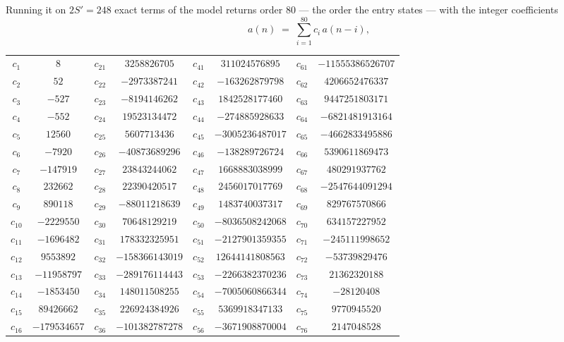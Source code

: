 \documentclass[11pt,a4paper]{article}
\theoremstyle{plain}
\theoremstyle{definition}
\begin{document}
Running it on $2S'=248$ exact terms of the model returns order $80$ --- the order the
entry states --- with the integer coefficients
\[
a(n)\;=\;\sum_{i=1}^{80}c_i\,a(n-i),
\]
\begin{center}\small
\begin{tabular}{cccccccc}
$c_{1}$ & $8$ & $c_{21}$ & $3258826705$ & $c_{41}$ & $311024576895$ & $c_{61}$ & $-11555386526707$ \\
$c_{2}$ & $52$ & $c_{22}$ & $-2973387241$ & $c_{42}$ & $-163262879798$ & $c_{62}$ & $4206652476337$ \\
$c_{3}$ & $-527$ & $c_{23}$ & $-8194146262$ & $c_{43}$ & $1842528177460$ & $c_{63}$ & $9447251803171$ \\
$c_{4}$ & $-552$ & $c_{24}$ & $19523134472$ & $c_{44}$ & $-274885928633$ & $c_{64}$ & $-6821481913164$ \\
$c_{5}$ & $12560$ & $c_{25}$ & $5607713436$ & $c_{45}$ & $-3005236487017$ & $c_{65}$ & $-4662833495886$ \\
$c_{6}$ & $-7920$ & $c_{26}$ & $-40873689296$ & $c_{46}$ & $-138289726724$ & $c_{66}$ & $5390611869473$ \\
$c_{7}$ & $-147919$ & $c_{27}$ & $23843244062$ & $c_{47}$ & $1668883038999$ & $c_{67}$ & $480291937762$ \\
$c_{8}$ & $232662$ & $c_{28}$ & $22390420517$ & $c_{48}$ & $2456017017769$ & $c_{68}$ & $-2547644091294$ \\
$c_{9}$ & $890118$ & $c_{29}$ & $-88011218639$ & $c_{49}$ & $1483740037317$ & $c_{69}$ & $829767570866$ \\
$c_{10}$ & $-2229550$ & $c_{30}$ & $70648129219$ & $c_{50}$ & $-8036508242068$ & $c_{70}$ & $634157227952$ \\
$c_{11}$ & $-1696482$ & $c_{31}$ & $178332325951$ & $c_{51}$ & $-2127901359355$ & $c_{71}$ & $-245111998652$ \\
$c_{12}$ & $9553892$ & $c_{32}$ & $-158366143019$ & $c_{52}$ & $12644141808563$ & $c_{72}$ & $-53739829476$ \\
$c_{13}$ & $-11958797$ & $c_{33}$ & $-289176114443$ & $c_{53}$ & $-2266382370236$ & $c_{73}$ & $21362320188$ \\
$c_{14}$ & $-1853450$ & $c_{34}$ & $148011508255$ & $c_{54}$ & $-7005060866344$ & $c_{74}$ & $-28120408$ \\
$c_{15}$ & $89426662$ & $c_{35}$ & $226924384926$ & $c_{55}$ & $5369918347133$ & $c_{75}$ & $9770945520$ \\
$c_{16}$ & $-179534657$ & $c_{36}$ & $-101382787278$ & $c_{56}$ & $-3671908870004$ & $c_{76}$ & $2147048528$ \\

\end{tabular}
\end{center}
\end{document}

